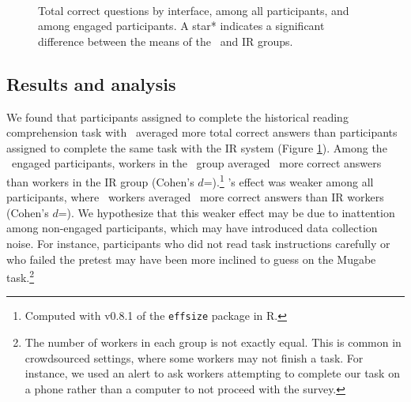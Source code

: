 \begin{figure}[h]
    \centering
    \\
    \subfloat{ 
            
    }
    \caption{Total correct questions by interface, among all participants, and among engaged participants. A star* indicates a significant difference between the means of the \ours~and IR groups.}\label{f:crowdresults}
\end{figure}



\subsection{Results and analysis}

We found that participants assigned to complete the historical reading comprehension task with \ours~averaged more total correct answers than participants assigned to complete the same task with the IR system (Figure \ref{f:crowdresults}). 
Among the \nengaged~engaged participants,
workers in the \ours~group averaged \deltaCQengaged~more correct answers than workers in the IR group (Cohen's $d$=\cohensengaged).\footnote{Computed with v0.8.1 of the \texttt{effsize} package in R.}
\ours's effect was weaker among all participants, where \ours~workers averaged \deltaCQall~more correct answers than IR workers (Cohen's $d$=\cohensALL). 
We hypothesize that this weaker effect may be due to inattention among non-engaged participants, which may have introduced data collection noise.
For instance, participants who did not read task instructions carefully or who failed the pretest may have been more inclined to guess on the Mugabe task.\footnote{The number of workers in each group is not exactly equal. This is common in crowdsourced settings, where some workers may not finish a task. For instance, we used an alert to ask workers attempting to complete our task on a phone rather than a computer to not proceed with the survey.}


